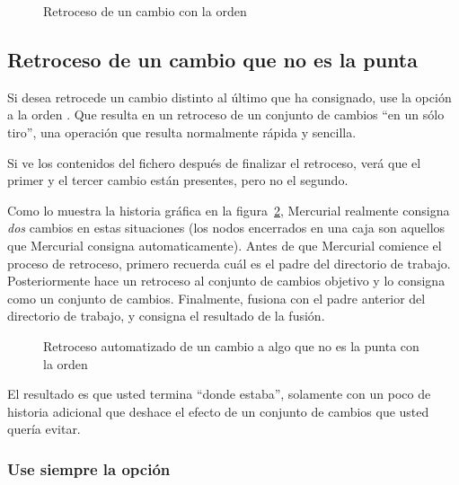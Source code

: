 \begin{figure}[htb]
  \centering
  \caption{Retroceso de un cambio con la orden }
  \label{fig:undo:backout}
\end{figure}

\subsection{Retroceso de un cambio que no es la punta}

Si desea retrocede un cambio distinto al último que ha consignado, use
la opción  a la orden .
Que resulta en un retroceso de un conjunto de cambios ``en un sólo
tiro'', una operación que resulta normalmente rápida y sencilla.

Si ve los contenidos del fichero  después de
finalizar el retroceso, verá que el primer y el tercer cambio están
presentes, pero no el segundo.

Como lo muestra la historia gráfica en la
figura~\ref{fig:undo:backout-non-tip}, Mercurial realmente consigna
\emph{dos} cambios en estas situaciones (los nodos encerrados en una
caja son aquellos que Mercurial consigna automaticamente).  Antes de
que Mercurial comience el proceso de retroceso, primero recuerda cuál
es el padre del directorio de trabajo.  Posteriormente hace un
retroceso al conjunto de cambios objetivo y lo consigna como un
conjunto de cambios. Finalmente, fusiona con el padre anterior del
directorio de trabajo, y consigna el resultado de la fusión.


\begin{figure}[htb]
  \centering
  \caption{Retroceso automatizado de un cambio a algo que no es la punta con la orden }
  \label{fig:undo:backout-non-tip}
\end{figure}

El resultado es que usted termina ``donde estaba'', solamente con un
poco de historia adicional que deshace el efecto de un conjunto de
cambios que usted quería evitar.

\subsubsection{Use siempre la opción }

